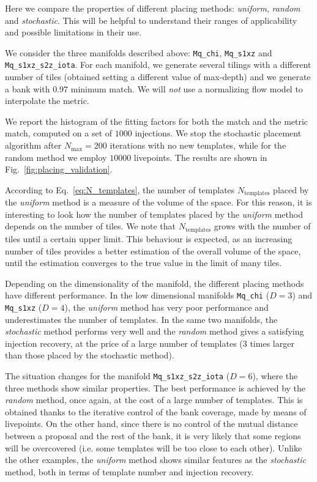 \documentclass[twocolumn,showpacs,preprintnumbers,nofootinbib,prd,
superscriptaddress,10pt]{revtex4-2}
\begin{document}
Here we compare the properties of different placing methods: \textit{uniform}, \textit{random} and \textit{stochastic}.
This will be helpful to understand their ranges of applicability and possible limitations in their use.

We consider the three manifolds described above: \texttt{Mq\_chi}, \texttt{Mq\_s1xz} and \texttt{Mq\_s1xz\_s2z\_iota}.
For each manifold, we generate several tilings with a different number of tiles (obtained setting a different value of max-depth) and we generate a bank with $0.97$ minimum match.
We will {\it not} use a normalizing flow model to interpolate the metric.

We report the histogram of the fitting factors for both the match and the metric match, computed on a set of $1000$ injections.
We stop the stochastic placement algorithm after $N_\text{max} = 200$ iterations with no new templates, while for the random method we employ $10000$ livepoints.
The results are shown in Fig.~\ref{fig:placing_validation}.

According to Eq.~\eqref{eq:N_templates}, the number of templates $N_{\text{templates}}$ placed by the {\it uniform} method is a measure of the volume of the space. For this reason, it is interesting to look how the number of templates placed by the {\it uniform} method depends on the number of tiles.
We note that $N_{\text{templates}}$ grows with the number of tiles until a certain upper limit. This behaviour is expected, as an increasing number of tiles provides a better estimation of the overall volume of the space, until the estimation converges to the true value in the limit of many tiles. 

Depending on the dimensionality of the manifold, the different placing methods have different performance.
In the low dimensional manifolds \texttt{Mq\_chi} ($D=3$) and \texttt{Mq\_s1xz} ($D=4$), the {\it uniform} method has very poor performance and underestimates the number of templates. In the same two manifolds, the {\it stochastic} method performs very well and the {\it random} method gives a satisfying injection recovery, at the price of a large number of templates (3 times larger than those placed by the stochastic method).

The situation changes for the manifold \texttt{Mq\_s1xz\_s2z\_iota} ($D=6$), where the three methods show similar properties. The best performance is achieved by the {\it random} method, once again, at the cost of a large number of templates.
This is obtained thanks to the iterative control of the bank coverage, made by means of livepoints. On the other hand, since there is no control of the mutual distance between a proposal and the rest of the bank, it is very likely that some regions will be overcovered (i.e. some templates will be too close to each other).
Unlike the other examples, the {\it uniform} method shows similar features as the {\it stochastic} method, both in terms of template number and injection recovery.
\end{document}
